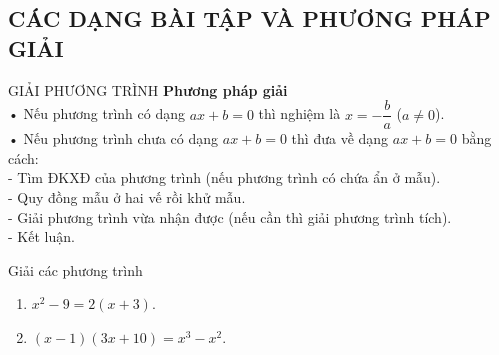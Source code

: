 \subsection{CÁC DẠNG BÀI TẬP VÀ PHƯƠNG PHÁP GIẢI}
\begin{dang}{GIẢI PHƯƠNG TRÌNH}
\textbf{Phương pháp giải} \\
• Nếu phương trình có dạng $ax+b=0$ thì nghiệm là $x=-\dfrac{b}{a}$ ($a\ne 0$). \\
• Nếu phương trình chưa có dạng $ax+b=0$ thì đưa về dạng $ax+b=0$ bằng cách: \\
- Tìm ĐKXĐ của phương trình (nếu phương trình có chứa ẩn ở mẫu). \\
- Quy đồng mẫu ở hai vế rồi khử mẫu. \\
- Giải phương trình vừa nhận được (nếu cần thì giải phương trình tích). \\
- Kết luận.
\end{dang}

\begin{vd}%
Giải các phương trình 
\begin{enumerate}
\item $x^2-9=2(x+3)$. 
\item $(x-1)(3x+10)=x^3-x^2$. 
\end{enumerate}
\end{vd}

